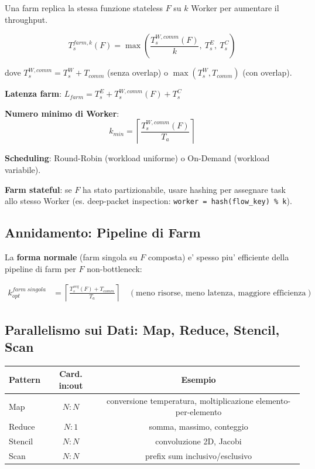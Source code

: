 \documentclass[11pt,a4paper]{article}
\theoremstyle{remark}
\begin{document}
Una farm replica la stessa funzione stateless $F$ su $k$ Worker per aumentare il throughput.

\begin{equation}
T_s^{farm,k}(F) = \max\!\left(\frac{T_s^{W,comm}(F)}{k},\ T_s^E,\ T_s^C\right)
\end{equation}

dove $T_s^{W,comm} = T_s^W + T_{comm}$ (senza overlap) o $\max(T_s^W, T_{comm})$ (con overlap).

\textbf{Latenza farm}: $L_{farm} = T_s^E + T_s^{W,comm}(F) + T_s^C$

\textbf{Numero minimo di Worker}:
\begin{equation}
k_{min} = \left\lceil \frac{T_s^{W,comm}(F)}{T_a} \right\rceil
\end{equation}

\textbf{Scheduling}: Round-Robin (workload uniforme) o On-Demand (workload variabile).

\textbf{Farm stateful}: se $F$ ha stato partizionabile, usare hashing per assegnare task allo stesso Worker (es. deep-packet inspection: \lstinline|worker = hash(flow_key) % k|).

\subsection{Annidamento: Pipeline di Farm}

La \textbf{forma normale} (farm singola su $F$ composta) e' spesso piu' efficiente della pipeline di farm per $F$ non-bottleneck:

\begin{align*}
k_{opt}^{farm\;singola} &= \left\lceil \frac{T_s^{seq}(F) + T_{comm}}{T_a} \right\rceil \quad (\text{meno risorse, meno latenza, maggiore efficienza})
\end{align*}

\subsection{Parallelismo sui Dati: Map, Reduce, Stencil, Scan}

\begin{center}
\begin{tabular}{lcc}
\toprule
\textbf{Pattern} & \textbf{Card. in:out} & \textbf{Esempio} \\
\midrule
Map & $N:N$ & conversione temperatura, moltiplicazione elemento-per-elemento \\
Reduce & $N:1$ & somma, massimo, conteggio \\
Stencil & $N:N$ & convoluzione 2D, Jacobi \\
Scan & $N:N$ & prefix sum inclusivo/esclusivo \\
\bottomrule
\end{tabular}
\end{center}
\end{document}
